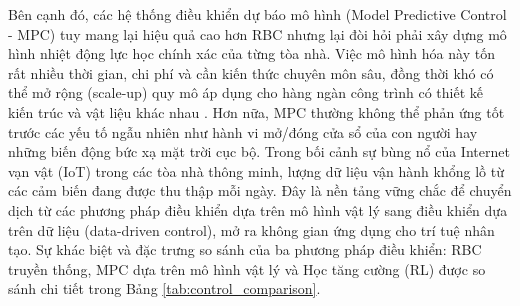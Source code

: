 \documentclass[12pt, a4paper]{report}
\begin{document}
Bên cạnh đó, các hệ thống điều khiển dự báo mô hình (Model Predictive Control - MPC) tuy mang lại hiệu quả cao hơn RBC nhưng lại đòi hỏi phải xây dựng mô hình nhiệt động lực học chính xác của từng tòa nhà. Việc mô hình hóa này tốn rất nhiều thời gian, chi phí và cần kiến thức chuyên môn sâu, đồng thời khó có thể mở rộng (scale-up) quy mô áp dụng cho hàng ngàn công trình có thiết kế kiến trúc và vật liệu khác nhau \cite{whulx}. Hơn nữa, MPC thường không thể phản ứng tốt trước các yếu tố ngẫu nhiên như hành vi mở/đóng cửa sổ của con người hay những biến động bức xạ mặt trời cục bộ. Trong bối cảnh sự bùng nổ của Internet vạn vật (IoT) trong các tòa nhà thông minh, lượng dữ liệu vận hành khổng lồ từ các cảm biến đang được thu thập mỗi ngày. Đây là nền tảng vững chắc để chuyển dịch từ các phương pháp điều khiển dựa trên mô hình vật lý sang điều khiển dựa trên dữ liệu (data-driven control), mở ra không gian ứng dụng cho trí tuệ nhân tạo. Sự khác biệt và đặc trưng so sánh của ba phương pháp điều khiển: RBC truyền thống, MPC dựa trên mô hình vật lý và Học tăng cường (RL) được so sánh chi tiết trong Bảng \ref{tab:control_comparison}.
\end{document}
